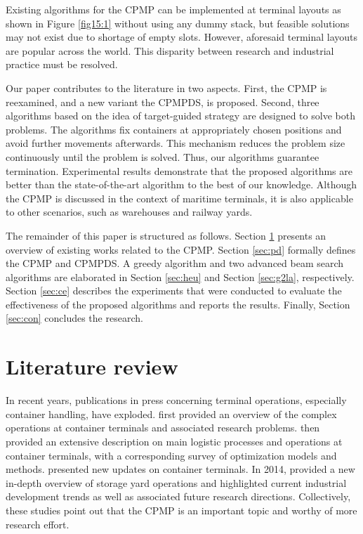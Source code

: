 \documentclass[review,3p,times,authoryear,12pt]{elsarticle}
\begin{document}
Existing algorithms for the CPMP can be implemented at terminal layouts as shown in Figure \ref{fig15:1} without using any dummy stack, but feasible solutions may not exist due to shortage of empty slots.
However, aforesaid terminal layouts are popular across the world.
This disparity between research and industrial practice must be resolved.

Our paper contributes to the literature in two aspects.
First, the CPMP is reexamined, and a new variant the CPMPDS, is proposed.
Second, three algorithms based on the idea of target-guided strategy are designed to solve both problems.
The algorithms fix containers at appropriately chosen positions and avoid further movements afterwards.
This mechanism reduces the problem size continuously until the problem is solved.
Thus, our algorithms guarantee termination.
Experimental results demonstrate that the proposed algorithms are better than the state-of-the-art algorithm to the best of our knowledge.
Although the CPMP is discussed in the context of maritime terminals, it is also applicable to other scenarios, such as warehouses \citep{Muppani2008} and railway yards.

The remainder of this paper is structured as follows.
Section \ref{sec:litreview} presents an overview of existing works related to the CPMP.
Section \ref{sec:pd} formally defines the CPMP and CPMPDS.
A greedy algorithm and two advanced beam search algorithms are elaborated in Section \ref{sec:heu} and Section \ref{sec:g2la}, respectively.
Section \ref{sec:ce} describes the experiments that were conducted to evaluate the effectiveness of the proposed algorithms and reports the results.
Finally, Section \ref{sec:con} concludes the research.

\section{Literature review}
\label{sec:litreview}

In recent years, publications in press concerning terminal operations, especially container handling, have exploded.
\cite{Vis2003} first provided an overview of the complex operations at container terminals and associated research problems.
\cite{Steenken2004} then provided an extensive description on main logistic processes and operations at container terminals, with a corresponding survey of optimization models and methods.
\cite{Stahlbock2008} presented new updates on container terminals.
In 2014, \cite{Carlo2014} provided a new in-depth overview of storage yard operations and highlighted current industrial development trends as well as associated future research directions.
Collectively, these studies point out that the CPMP is an important topic and worthy of more research effort.
\end{document}
